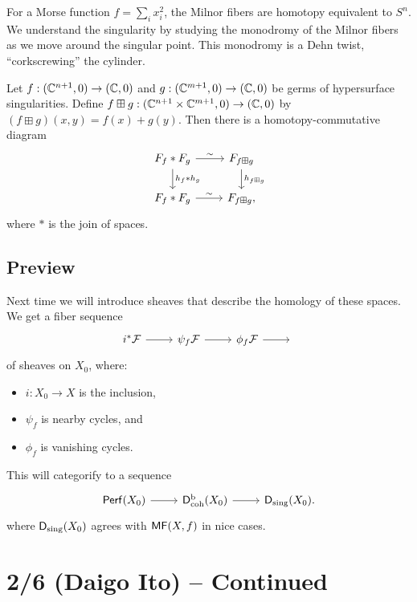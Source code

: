 \documentclass{article}
\begin{document}
\begin{ex}
	For a Morse function $f = \sum_i x_i^2$, the Milnor fibers are homotopy equivalent to $S^n$.
	We understand the singularity by studying the monodromy of the Milnor fibers as we move around the singular point.
	This monodromy is a Dehn twist, ``corkscrewing'' the cylinder.
\end{ex}

\begin{thm}
	Let $f: (\mathbb{C}^{n+1}, 0) \to (\mathbb{C}, 0)$ and $g: (\mathbb{C}^{m+1}, 0) \to (\mathbb{C}, 0)$ be germs of hypersurface singularities.
	Define $f \boxplus g: (\mathbb{C}^{n+1} \times \mathbb{C}^{m+1}, 0) \to (\mathbb{C}, 0)$ by $(f \boxplus g)(x, y) = f(x) + g(y)$.
	Then there is a homotopy-commutative diagram
	\[
		\begin{tikzcd}
			F_f * F_g \rar["\sim"] \dar["h_f * h_g"] & F_{f \boxplus g} \dar["h_{f \boxplus g}"] \\
			F_f * F_g \rar["\sim"] & F_{f \boxplus g},
		\end{tikzcd}
	\]
	where $*$ is the join of spaces.
\end{thm}

\subsection{Preview}

Next time we will introduce sheaves that describe the homology of these spaces.
We get a fiber sequence
\[
	\begin{tikzcd}
		i^*\Fc \rar & \psi_f \Fc \rar & \phi_f \Fc \rar & {}
	\end{tikzcd}
\]
of sheaves on $X_0$, where:
\begin{itemize}
	\item $i: X_0 \to X$ is the inclusion,
	\item $\psi_f$ is nearby cycles, and
	\item $\phi_f$ is vanishing cycles.
\end{itemize}

This will categorify to a sequence
\[
	\begin{tikzcd}
		\Perf(X_0) \rar & \Dbcoh(X_0) \rar & \Dsing(X_0).
	\end{tikzcd}
\]
where $\mathsf{D}_{\mathrm{sing}}(X_0)$ agrees with $\mathsf{MF}(X, f)$ in nice cases.

\section{2/6 (Daigo Ito) -- Continued}
\end{document}
